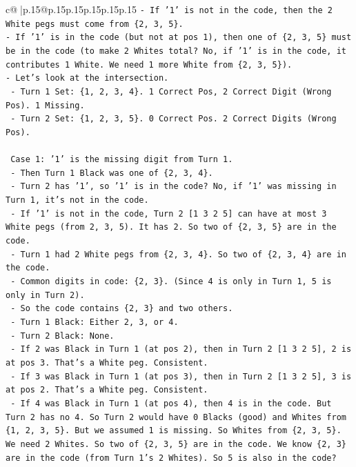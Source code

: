 \documentclass{article}
\begin{document}
{\begin{supertabular}{c@{$\;$}|p{.15\linewidth}@{}p{.15\linewidth}p{.15\linewidth}p{.15\linewidth}p{.15\linewidth}p{.15\linewidth}}
{{{\texttt{{-} If '1' is not in the code, then the 2 White pegs must come from \{2, 3, 5\}.} \\
\texttt{{-} If '1' is in the code (but not at pos 1), then one of \{2, 3, 5\} must be in the code (to make 2 Whites total? No, if '1' is in the code, it contributes 1 White. We need 1 more White from \{2, 3, 5\}).} \\
\texttt{{-} Let's look at the intersection.} \\
\texttt{  {-} Turn 1 Set: \{1, 2, 3, 4\}. 1 Correct Pos, 2 Correct Digit (Wrong Pos). 1 Missing.} \\
\texttt{  {-} Turn 2 Set: \{1, 2, 3, 5\}. 0 Correct Pos. 2 Correct Digits (Wrong Pos).} \\
\\ 
\texttt{  Case 1: '1' is the missing digit from Turn 1.} \\
\texttt{  {-} Then Turn 1 Black was one of \{2, 3, 4\}.} \\
\texttt{  {-} Turn 2 has '1', so '1' is in the code? No, if '1' was missing in Turn 1, it's not in the code.} \\
\texttt{  {-} If '1' is not in the code, Turn 2 {[}1 3 2 5{]} can have at most 3 White pegs (from 2, 3, 5). It has 2. So two of \{2, 3, 5\} are in the code.} \\
\texttt{  {-} Turn 1 had 2 White pegs from \{2, 3, 4\}. So two of \{2, 3, 4\} are in the code.} \\
\texttt{  {-} Common digits in code: \{2, 3\}. (Since 4 is only in Turn 1, 5 is only in Turn 2).} \\
\texttt{  {-} So the code contains \{2, 3\} and two others.} \\
\texttt{  {-} Turn 1 Black: Either 2, 3, or 4.} \\
\texttt{  {-} Turn 2 Black: None.} \\
\texttt{  {-} If 2 was Black in Turn 1 (at pos 2), then in Turn 2 {[}1 3 2 5{]}, 2 is at pos 3. That's a White peg. Consistent.} \\
\texttt{  {-} If 3 was Black in Turn 1 (at pos 3), then in Turn 2 {[}1 3 2 5{]}, 3 is at pos 2. That's a White peg. Consistent.} \\
\texttt{  {-} If 4 was Black in Turn 1 (at pos 4), then 4 is in the code. But Turn 2 has no 4. So Turn 2 would have 0 Blacks (good) and Whites from \{1, 2, 3, 5\}. But we assumed 1 is missing. So Whites from \{2, 3, 5\}. We need 2 Whites. So two of \{2, 3, 5\} are in the code. We know \{2, 3\} are in the code (from Turn 1's 2 Whites). So 5 is also in the code?} \\
}}}
\end{supertabular}}
\end{document}
